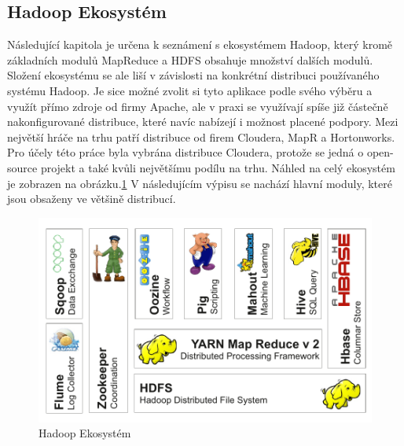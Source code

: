 \documentclass[thesis=M,czech]{FITthesis}[2012/06/26]
\begin{document}
\clearpage
\subsection{Hadoop Ekosystém}
Následující kapitola je určena k seznámení s ekosystémem Hadoop, který kromě základních modulů MapReduce a HDFS obsahuje množství dalších modulů. Složení ekosystému se ale liší v závislosti na konkrétní distribuci používaného systému Hadoop. Je sice možné zvolit si tyto aplikace podle svého výběru a využít přímo zdroje od firmy Apache, ale v praxi se využívají spíše již částečně nakonfigurované distribuce, které navíc nabízejí i možnost placené podpory. Mezi největší hráče na trhu patří distribuce od firem Cloudera, MapR a Hortonworks\cite{CLOUDERA}. Pro účely této práce byla vybrána distribuce Cloudera, protože se jedná o open-source projekt a také kvůli největšímu podílu na trhu. Náhled na celý ekosystém je zobrazen na obrázku.\ref{fig:eko} V následujícím výpisu se nachází hlavní moduly, které jsou obsaženy ve většině distribucí.

\begin{figure}[h]\centering
	\includegraphics[width=1\textwidth, angle=0]{files/HadoopEco}
	\caption[Hadoop Ekosystém]{Hadoop Ekosystém}\label{fig:eko}
\end{figure}
\end{document}
